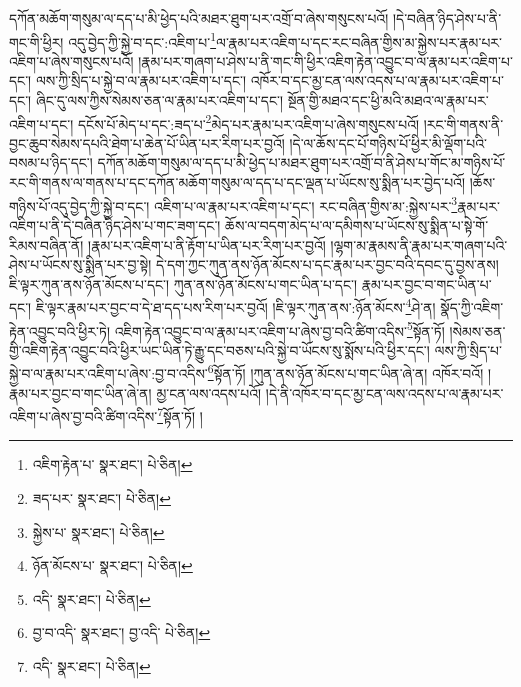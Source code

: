 དཀོན་མཆོག་གསུམ་ལ་དད་པ་མི་ཕྱེད་པའི་མཐར་ཐུག་པར་འགྲོ་བ་ཞེས་གསུངས་པའོ། །དེ་བཞིན་ཉིད་ཤེས་པ་ནི་གང་གི་ཕྱིར། འདུ་བྱེད་ཀྱི་སྐྱེ་བ་དང་:འཇིག་པ་\footnote{འཇིག་རྟེན་པ་  སྣར་ཐང་།  པེ་ཅིན། }ལ་རྣམ་པར་འཇིག་པ་དང་རང་བཞིན་གྱིས་མ་སྐྱེས་པར་རྣམ་པར་འཇིག་པ་ཞེས་གསུངས་པའོ། །རྣམ་པར་གཞག་པ་ཤེས་པ་ནི་གང་གི་ཕྱིར་འཇིག་རྟེན་འབྱུང་བ་ལ་རྣམ་པར་འཇིག་པ་དང་། ལས་ཀྱི་སྲིད་པ་སྐྱེ་བ་ལ་རྣམ་པར་འཇིག་པ་དང་། འཁོར་བ་དང་མྱ་ངན་ལས་འདས་པ་ལ་རྣམ་པར་འཇིག་པ་དང་། ཞིང་དུ་ལས་ཀྱིས་སེམས་ཅན་ལ་རྣམ་པར་འཇིག་པ་དང་། སྔོན་གྱི་མཐའ་དང་ཕྱི་མའི་མཐའ་ལ་རྣམ་པར་འཇིག་པ་དང་། དངོས་པོ་མེད་པ་དང་:ཟད་པ་\footnote{ཟད་པར་  སྣར་ཐང་།  པེ་ཅིན། }མེད་པར་རྣམ་པར་འཇིག་པ་ཞེས་གསུངས་པའོ། །རང་གི་གནས་ནི་བྱང་ཆུབ་སེམས་དཔའི་ཐེག་པ་ཆེན་པོ་ཡིན་པར་རིག་པར་བྱའོ། །དེ་ལ་ཆོས་དང་པོ་གཉིས་པོ་ཕྱིར་མི་ལྡོག་པའི་བསམ་པ་ཉིད་དང་། དཀོན་མཆོག་གསུམ་ལ་དད་པ་མི་ཕྱེད་པ་མཐར་ཐུག་པར་འགྲོ་བ་ནི་ཤེས་པ་གོང་མ་གཉིས་པོ་རང་གི་གནས་ལ་གནས་པ་དང་དཀོན་མཆོག་གསུམ་ལ་དད་པ་དང་ལྡན་པ་ཡོངས་སུ་སྨིན་པར་བྱེད་པའོ། །ཆོས་གཉིས་པོ་འདུ་བྱེད་ཀྱི་སྐྱེ་བ་དང་། འཇིག་པ་ལ་རྣམ་པར་འཇིག་པ་དང་། རང་བཞིན་གྱིས་མ་:སྐྱེས་པར་\footnote{སྐྱེས་པ་  སྣར་ཐང་།  པེ་ཅིན། }རྣམ་པར་འཇིག་པ་ནི་དེ་བཞིན་ཉིད་ཤེས་པ་གང་ཟག་དང་། ཆོས་ལ་བདག་མེད་པ་ལ་དམིགས་པ་ཡོངས་སུ་སྨིན་པ་སྟེ་གོ་རིམས་བཞིན་ནོ། །རྣམ་པར་འཇིག་པ་ནི་རྟོག་པ་ཡིན་པར་རིག་པར་བྱའོ། །ལྷག་མ་རྣམས་ནི་རྣམ་པར་གཞག་པའི་ཤེས་པ་ཡོངས་སུ་སྨིན་པར་བྱ་སྟེ། དེ་དག་ཀྱང་ཀུན་ནས་ཉོན་མོངས་པ་དང་རྣམ་པར་བྱང་བའི་དབང་དུ་བྱས་ནས། ཇི་ལྟར་ཀུན་ནས་ཉོན་མོངས་པ་དང་། ཀུན་ནས་ཉོན་མོངས་པ་གང་ཡིན་པ་དང་། རྣམ་པར་བྱང་བ་གང་ཡིན་པ་དང་། ཇི་ལྟར་རྣམ་པར་བྱང་བ་དེ་ཐ་དད་པས་རིག་པར་བྱའོ། །ཇི་ལྟར་ཀུན་ནས་:ཉོན་མོངས་\footnote{ཉོན་མོངས་པ་  སྣར་ཐང་།  པེ་ཅིན། }ཤེ་ན། སྣོད་ཀྱི་འཇིག་རྟེན་འབྱུང་བའི་ཕྱིར་ཏེ། འཇིག་རྟེན་འབྱུང་བ་ལ་རྣམ་པར་འཇིག་པ་ཞེས་བྱ་བའི་ཚིག་འདིས་\footnote{འདི་  སྣར་ཐང་།  པེ་ཅིན། }སྟོན་ཏོ། །སེམས་ཅན་གྱི་འཇིག་རྟེན་འབྱུང་བའི་ཕྱིར་ཡང་ཡིན་ཏེ་རྒྱུ་དང་བཅས་པའི་སྐྱེ་བ་ཡོངས་སུ་སྨོས་པའི་ཕྱིར་དང་། ལས་ཀྱི་སྲིད་པ་སྐྱེ་བ་ལ་རྣམ་པར་འཇིག་པ་ཞེས་:བྱ་བ་འདིས་\footnote{བྱ་བ་འདི་  སྣར་ཐང་། བྱ་འདི་  པེ་ཅིན། }སྟོན་ཏོ། །ཀུན་ནས་ཉོན་མོངས་པ་གང་ཡིན་ཞེ་ན། འཁོར་བའོ། །རྣམ་པར་བྱང་བ་གང་ཡིན་ཞེ་ན། མྱ་ངན་ལས་འདས་པའོ། །དེ་ནི་འཁོར་བ་དང་མྱ་ངན་ལས་འདས་པ་ལ་རྣམ་པར་འཇིག་པ་ཞེས་བྱ་བའི་ཚིག་འདིས་\footnote{འདི་  སྣར་ཐང་།  པེ་ཅིན། }སྟོན་ཏོ། །
